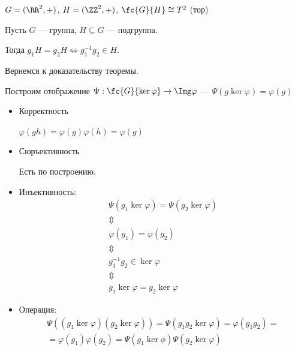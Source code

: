 \begin{exercise}{}{}
    \( G = (\RR^2, +) \), \( H = (\ZZ^2, +) \), \( \fc{G}{H} \cong T^2 \) (тор)
\end{exercise}

\begin{exercise}{}{}
    Пусть \( G \) --- группа, \( H \subseteq G \) --- подгруппа.

    Тогда \( g_1 H = g_2 H \Leftrightarrow g_1^{-1} g_2 \in H \).
\end{exercise}

Вернемся к доказательству теоремы.

Построим отображение \( \Psi : \fc{G}{\ker \varphi} \to \Img \varphi \) --- \( \Psi( g \ker \varphi) = \varphi(g) \)

\begin{itemize}
    \item
        Корректность

        \( \varphi (gh) = \varphi(g) \varphi(h) = \varphi(g) \)
    \item
        Сюръективность

        Есть по построению.
    \item
        Инъективность:
        \begin{gather*}
            \Psi(g_1 \ker \varphi) = \Psi(g_2 \ker \varphi)
            \\
            \Updownarrow
            \\
            \varphi(g_1) = \varphi(g_2)
            \\
            \Updownarrow
            \\
            g_1^{-1} g_2 \in \ker \varphi
            \\
            \Updownarrow
            \\
            g_1 \ker \varphi = g_2 \ker \varphi
        \end{gather*}
    \item
        Операция:
        \begin{gather*}
            \Psi( (g_1 \ker \varphi) (g_2 \ker \varphi) )
            =
            \Psi(g_1 g_2 \ker \varphi)
            =
            \varphi(g_1 g_2)
            =
            \\
            =
            \varphi(g_1) \varphi(g_2)
            =
            \Psi(g_1 \ker \phi) \Psi(g_2 \ker \varphi)
        \end{gather*}
\end{itemize}

